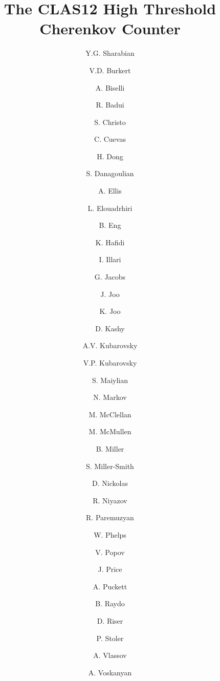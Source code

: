 \title{The CLAS12 High Threshold Cherenkov Counter}

\author[1]{Y.G. Sharabian}
\author[1]{V.D. Burkert}
\author[2]{A. Biselli}
\author[13]{R. Badui}
\author[1]{S. Christo}
\author[1]{C. Cuevas}
\author[1]{H. Dong}
\author[3]{S. Danagoulian}
\author[1]{A. Ellis}
\author[1]{L. Elouadrhiri}
\author[1]{B. Eng}
\author[4]{K. Hafidi}
\author[5]{I. Illari}
\author[1]{G. Jacobs}
\author[6]{J. Joo}
\author[6]{K. Joo}
\author[1]{D. Kashy}
\author[6]{A.V. Kubarovsky}
\author[1]{V.P. Kubarovsky}
\author[7]{S. Maiylian}
\author[1]{N. Markov}
\author[6]{M. McClellan}
\author[1]{M. McMullen}
\author[1]{B. Miller}
\author[11]{S. Miller-Smith}
\author[11]{D. Nickolas}
\author[8]{R. Niyazov}
\author[9]{R. Paremuzyan}
\author[10]{W. Phelps}
\author[1]{V. Popov}
\author[11]{J. Price}
\author[6]{A. Puckett}
\author[1]{B. Raydo}
\author[6]{D. Riser}
\author[8]{P. Stoler}
\author[12]{A. Vlassov}
\author[7]{A. Voskanyan}

\address[1]{Thomas Jefferson National Accelerator Facility, Newport News, VA 23606}
\address[2]{Fairfield University, Fairfield, CT 06824}
\address[3]{North Carolina Agricultural and Technical State University, Greensboro, NC 27401}
\address[4]{Argonne National Laboratory, Argonne, IL 60439}
\address[5]{The George Washington University, Washington, DC 20052}
\address[6]{University of Connecticut, Storrs, CT 06269}
\address[7]{Yerevan Physics Institute, 375036, Yerevan, Armenia}
\address[8]{Rensselaer Polytechnic Institute, Troy, NY 12180}
\address[9]{University of New Hampshire, Durham, NH 03834}
\address[10]{Christopher Newport University, Newport News, VA 23606}
\address[11]{California State University, Dominguez Hills, Carson, CA 90747}
\address[12]{National Research Centre Kurchatov Institute - ITEP, Moscow, 117218, Russia}
\address[13]{Florida International University, Miami, FL 33199}
